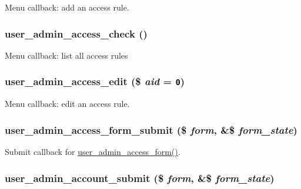 Menu callback: add an access rule. \hypertarget{user_8admin_8inc_d0bc9db07cf5e16156c0f1eeff5ee675}{
\subsubsection[{user\_\-admin\_\-access\_\-check}]{\setlength{\rightskip}{0pt plus 5cm}user\_\-admin\_\-access\_\-check ()}}
\label{user_8admin_8inc_d0bc9db07cf5e16156c0f1eeff5ee675}


Menu callback: list all access rules \hypertarget{user_8admin_8inc_1a1124d9c69fc269df4a829022b4e31a}{
\subsubsection[{user\_\-admin\_\-access\_\-edit}]{\setlength{\rightskip}{0pt plus 5cm}user\_\-admin\_\-access\_\-edit (\$ {\em aid} = {\tt 0})}}
\label{user_8admin_8inc_1a1124d9c69fc269df4a829022b4e31a}


Menu callback: edit an access rule. \hypertarget{user_8admin_8inc_6ccedba4491a28dbdcb607f94c8f8b25}{
\subsubsection[{user\_\-admin\_\-access\_\-form\_\-submit}]{\setlength{\rightskip}{0pt plus 5cm}user\_\-admin\_\-access\_\-form\_\-submit (\$ {\em form}, \/  \&\$ {\em form\_\-state})}}
\label{user_8admin_8inc_6ccedba4491a28dbdcb607f94c8f8b25}


Submit callback for \hyperlink{group__forms_g47c21b0d7ce383f4e8b25a71b064a8ef}{user\_\-admin\_\-access\_\-form()}. \hypertarget{user_8admin_8inc_20540c356ad435d034ff0229323f33d5}{
\subsubsection[{user\_\-admin\_\-account\_\-submit}]{\setlength{\rightskip}{0pt plus 5cm}user\_\-admin\_\-account\_\-submit (\$ {\em form}, \/  \&\$ {\em form\_\-state})}}
\label{user_8admin_8inc_20540c356ad435d034ff0229323f33d5}


